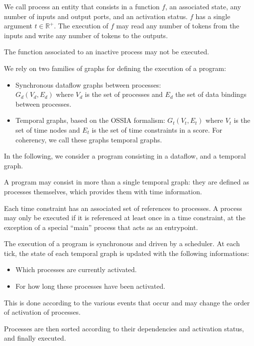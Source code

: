 \documentclass{article}
\begin{document}
We call process an entity that consists in a function $f$, an associated state, any number of inputs and output ports, and an activation status.
$f$ has a single argument $t \in \mathbb{R^+}$.
The execution of $f$ may read any number of tokens from the inputs and write any number of tokens to the outputs.
    
The function associated to an inactive process may not be executed.

We rely on two families of graphs for defining the execution of a program:
    
\begin{itemize}
  \item Synchronous dataflow graphs between processes:~\\$G_d(V_d, E_d)$ where $V_d$ is the set of processes and $E_d$ the set of data bindings between processes.
	
  \item Temporal graphs, based on the OSSIA formalism: $G_t(V_t, E_t)$ where $V_t$ is the set of time nodes and $E_t$ is the set of time constraints in a score. 
  For coherency, we call these graphs temporal graphs.
\end{itemize}

In the following, we consider a program consisting in a dataflow, and a temporal graph.
    
A program may consist in more than a single temporal graph: they are defined as processes themselves, which provides them with time information.
    
Each time constraint has an associated set of references to processes.
A process may only be executed if it is referenced at least once in a time constraint, 
at the exception of a special ``main'' process that acts as an entrypoint.
    
The execution of a program is synchronous and driven by a scheduler.
At each tick, the state of each temporal graph is updated with the following informations:
    
\begin{itemize}
  \item Which processes are currently activated.
  \item For how long these processes have been activated.
\end{itemize}

This is done according to the various events that occur and may change the order of activation of processes.

Processes are then sorted according to their dependencies and activation status, and finally executed.
    
\end{document}
